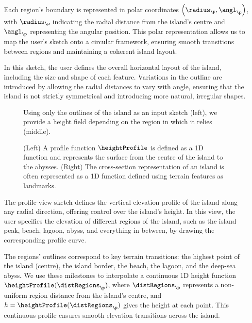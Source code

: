Each region's boundary is represented in polar coordinates $\left(\radius_\p, \angl_\p\right)$, with $\radius_\p$ indicating the radial distance from the island's centre and $\angl_\p$ representing the angular position. This polar representation allows us to map the user's sketch onto a circular framework, ensuring smooth transitions between regions and maintaining a coherent island layout.

In this sketch, the user defines the overall horizontal layout of the island, including the size and shape of each feature. Variations in the outline are introduced by allowing the radial distances to vary with angle, ensuring that the island is not strictly symmetrical and introducing more natural, irregular shapes.

\begin{figure}[H]
    \caption{Using only the outlines of the island as an input sketch (left), we provide a height field depending on the region in which it relies (middle).}
    \label{fig:coral-island-procedural-height-only}
\end{figure}


\begin{figure}
    \caption{(Left) A profile function $\heightProfile$ is defined as a 1D function and represents the surface from the centre of the island to the abysses. (Right) The cross-section representation of an island is often represented as a 1D function defined using terrain features as landmarks.}
    \label{fig:coral-island-profile-function}
\end{figure}

The profile-view sketch defines the vertical elevation profile of the island along any radial direction, offering control over the island's height. In this view, the user specifies the elevation of different regions of the island, such as the island peak, beach, lagoon, abyss, and everything in between, by drawing the corresponding profile curve.

The regions' outlines correspond to key terrain transitions: the highest point of the island (centre), the island border, the beach, the lagoon, and the deep-sea abyss. We use these milestones to interpolate a continuous 1D height function $\heightProfile(\distRegions_\p)$, where $\distRegions_\p$ represents a non-uniform region distance from the island's centre, and $h = \heightProfile(\distRegions_\p)$ gives the height at each point. This continuous profile ensures smooth elevation transitions across the island.

